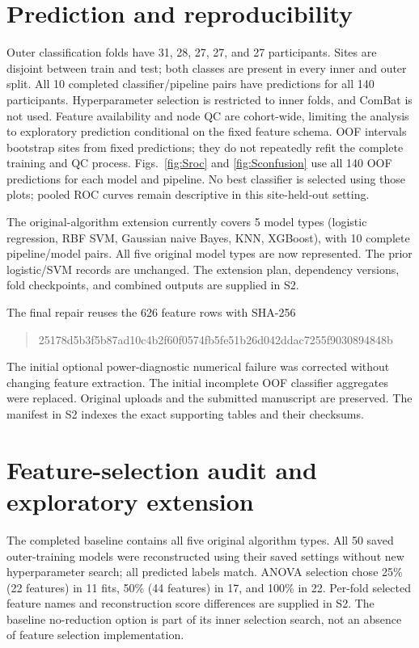 \documentclass[10pt,letterpaper]{article}
\begin{document}
\section*{Prediction and reproducibility}
Outer classification folds have 31, 28, 27, 27, and 27 participants. Sites are
disjoint between train and test; both classes are present in every inner and
outer split. All 10 completed classifier/pipeline pairs have predictions for all 140
participants. Hyperparameter selection is restricted to inner folds, and ComBat
is not used. Feature availability and node QC are cohort-wide, limiting the
analysis to exploratory prediction conditional on the fixed feature schema.
OOF intervals bootstrap sites from fixed predictions; they do not repeatedly
refit the complete training and QC process.
Figs.~\ref{fig:Sroc} and \ref{fig:Sconfusion} use all 140 OOF predictions for
each model and pipeline. No best classifier is selected using those plots;
pooled ROC curves remain descriptive in this site-held-out setting.

The original-algorithm extension currently covers 5 model types
(logistic regression, RBF SVM, Gaussian naive Bayes, KNN, XGBoost), with 10 complete pipeline/model pairs.
All five original model types are now represented.
The prior logistic/SVM records are unchanged. The extension plan, dependency versions,
fold checkpoints, and combined outputs are supplied in S2.

The final repair reuses the 626 feature rows with SHA-256
\begin{quote}\small\ttfamily
25178d5b3f5b87ad10c4b2f60f0574fb5fe51b26d042ddac7255f9030894848b
\end{quote}
The initial optional power-diagnostic numerical failure was corrected without
changing feature extraction. The initial incomplete OOF classifier aggregates
were replaced. Original uploads and the submitted manuscript are preserved.
The manifest in S2 indexes the exact supporting tables and their checksums.

\clearpage
\section*{Feature-selection audit and exploratory extension}
The completed baseline contains all five original algorithm types. All 50 saved
outer-training models were reconstructed using their saved settings without new
hyperparameter search; all predicted labels match. ANOVA selection chose 25\%
(22 features) in 11 fits, 50\% (44 features) in 17, and 100\% in 22. Per-fold
selected feature names and reconstruction score differences are supplied in S2.
The baseline no-reduction option is part of its inner selection search, not an
absence of feature selection implementation.
\end{document}
